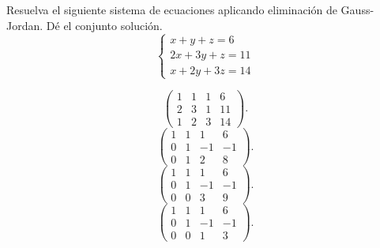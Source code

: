 \documentclass{emate-ucr}
\begin{document}
\begin{ejercicio}[\ptsguiaej]
  Resuelva el siguiente sistema de ecuaciones aplicando eliminación de
  Gauss-Jordan. Dé el conjunto solución.
  \[
    \begin{cases}
       x +  y +  z =  6 \\
      2x + 3y +  z = 11 \\
       x + 2y + 3z = 14
    \end{cases}
  \]

  \begin{solucion}
    \[
      \left(\begin{array}{ccc|r}
        1 & 1 & 1 &  6 \\
        2 & 3 & 1 & 11 \\
        1 & 2 & 3 & 14
      \end{array}\right).
    \]
     
    \[
      \left(\begin{array}{ccc|r}
        1 & 1 &  1 &  6 \\
        0 & 1 & -1 & -1 \\
        0 & 1 &  2 &  8
      \end{array}\right).
    \]
    \[
      \left(\begin{array}{ccc|r}
        1 & 1 &  1 &  6 \\
        0 & 1 & -1 & -1 \\
        0 & 0 &  3 &  9
      \end{array}\right).
    \]
    \[
      \left(\begin{array}{ccc|r}
        1 & 1 &  1 &  6 \\
        0 & 1 & -1 & -1 \\
        0 & 0 &  1 &  3
      \end{array}\right).
    \]
     

\end{solucion}
\end{ejercicio}
\end{document}
